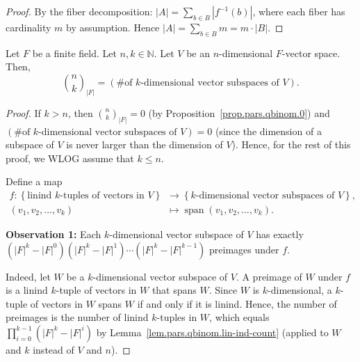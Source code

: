 \begin{proof}
\leanok
By the fiber decomposition: $|A| = \sum_{b \in B} |f^{-1}(b)|$,
where each fiber has cardinality $m$ by assumption.
Hence $|A| = \sum_{b \in B} m = m \cdot |B|$.
\end{proof}

\begin{theorem}
\label{thm.pars.qbinom.subsp-count}
\leantarget
\leanok
Let $F$ be a finite field. Let
$n,k\in\mathbb{N}$. Let $V$ be an $n$-dimensional $F$-vector space. Then,
\[
\binom{n}{k}_{\left\vert F\right\vert }=\left(  \text{\# of }%
k\text{-dimensional vector subspaces of }V\right)  .
\]
\end{theorem}

\begin{proof}
\leanok
If $k>n$, then $\binom{n}{k}_{\left\vert F\right\vert }=0$ (by
Proposition~\ref{prop.pars.qbinom.0}) and $\left(  \text{\# of }%
k\text{-dimensional vector subspaces of }V\right)  =0$ (since the dimension of
a subspace of $V$ is never larger than the dimension of $V$). Hence, for the rest of
this proof, we WLOG assume that $k\leq n$.

Define a map
\begin{align*}
f:\left\{  \text{linind }k\text{-tuples of vectors in }V\right\}   &
\rightarrow\left\{  k\text{-dimensional vector subspaces of }V\right\}  ,\\
\left(  v_{1},v_{2},\ldots,v_{k}\right)   &  \mapsto\operatorname{span}%
\left(  v_{1},v_{2},\ldots,v_{k}\right)  .
\end{align*}

\textbf{Observation 1:} Each $k$-dimensional vector subspace of $V$ has
exactly
$\left(  \left\vert F\right\vert ^{k}-\left\vert F\right\vert ^{0}\right)
\left(  \left\vert F\right\vert ^{k}-\left\vert F\right\vert ^{1}\right)
\cdots\left(  \left\vert F\right\vert ^{k}-\left\vert F\right\vert
^{k-1}\right)$
preimages under $f$.

Indeed, let $W$ be a $k$-dimensional vector subspace of $V$.
A preimage of $W$ under $f$ is a linind $k$-tuple
of vectors in $W$ that spans $W$.
Since $W$ is $k$-dimensional, a $k$-tuple of vectors in $W$ spans $W$ if and only if
it is linind. Hence, the number of preimages is the number of linind $k$-tuples in $W$,
which equals
$\prod_{i=0}^{k-1}(|F|^k - |F|^i)$
by Lemma~\ref{lem.pars.qbinom.lin-ind-count} (applied to $W$ and $k$ instead
of $V$ and $n$).


\end{proof}

